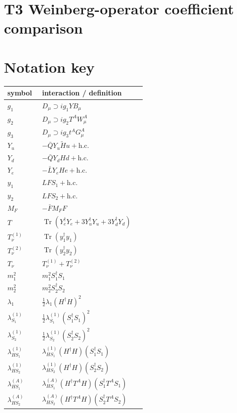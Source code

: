\documentclass[8pt]{article}
\begin{document}
\begin{landscape}
\section*{T3 Weinberg-operator coefficient comparison}
\section*{Notation key}
\begin{longtable}{@{}p{0.23\linewidth}p{0.69\linewidth}@{}}
\toprule
symbol & interaction / definition \\
\midrule
$g_1$ & $D_\mu\supset i g_1YB_\mu$ \\
$g_2$ & $D_\mu\supset i g_2T^AW_\mu^A$ \\
$g_3$ & $D_\mu\supset i g_3t^AG_\mu^A$ \\
$Y_u$ & $-\bar QY_u\widetilde Hu+\mathrm{h.c.}$ \\
$Y_d$ & $-\bar QY_dHd+\mathrm{h.c.}$ \\
$Y_e$ & $-\bar LY_eHe+\mathrm{h.c.}$ \\
$y_1$ & $LFS_1+\mathrm{h.c.}$ \\
$y_2$ & $LFS_2+\mathrm{h.c.}$ \\
$M_F$ & $-\bar FM_FF$ \\
$T$ & $\operatorname{Tr}(Y_e^\dagger Y_e+3Y_u^\dagger Y_u+3Y_d^\dagger Y_d)$ \\
$T_\nu^{(1)}$ & $\operatorname{Tr}(y_1^\dagger y_1)$ \\
$T_\nu^{(2)}$ & $\operatorname{Tr}(y_2^\dagger y_2)$ \\
$T_\nu$ & $T_\nu^{(1)}+T_\nu^{(2)}$ \\
$m_1^2$ & $m_1^2S_1^\dagger S_1$ \\
$m_2^2$ & $m_2^2S_2^\dagger S_2$ \\
$\lambda_1$ & $\frac12\lambda_1(H^\dagger H)^2$ \\
$\lambda_{S_1}^{(1)}$ & $\frac12\lambda_{S_1}^{(1)}(S_1^\dagger S_1)^2$ \\
$\lambda_{S_2}^{(1)}$ & $\frac12\lambda_{S_2}^{(1)}(S_2^\dagger S_2)^2$ \\
$\lambda_{HS_1}^{(1)}$ & $\lambda_{HS_1}^{(1)}(H^\dagger H)(S_1^\dagger S_1)$ \\
$\lambda_{HS_2}^{(1)}$ & $\lambda_{HS_2}^{(1)}(H^\dagger H)(S_2^\dagger S_2)$ \\
$\lambda_{HS_1}^{(A)}$ & $\lambda_{HS_1}^{(A)}(H^\dagger T^AH)(S_1^\dagger T^AS_1)$ \\
$\lambda_{HS_2}^{(A)}$ & $\lambda_{HS_2}^{(A)}(H^\dagger T^AH)(S_2^\dagger T^AS_2)$ \\

\end{longtable}
\end{landscape}
\end{document}
